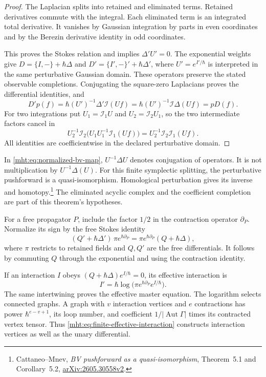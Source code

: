\begin{proof}
The Laplacian splits into retained and eliminated terms. Retained
derivatives commute with the integral. Each eliminated term is an
integrated total derivative. It vanishes by Gaussian integration by
parts in even coordinates and by the Berezin derivative identity in
odd coordinates.

This proves the Stokes relation and implies $\Delta'U'=0$.
The exponential weights give
$D=\{I,-\}+\hbar\Delta$ and
$D'=\{I',-\}'+\hbar\Delta'$, where $U'=e^{I'/\hbar}$ is
interpreted in the same perturbative Gaussian domain. These
operators preserve the stated observable completions. Conjugating
the square-zero Laplacians proves the differential identities, and
\[
 D'p(f)=\hbar(U')^{-1}\Delta'\mathcal I(Uf)
       =\hbar(U')^{-1}\mathcal I\Delta(Uf)=pD(f).
\]
For two integrations put $U_1=\mathcal I_1U$ and
$U_2=\mathcal I_2U_1$, so the two intermediate factors cancel in
\[
 U_2^{-1}\mathcal I_2\bigl(U_1U_1^{-1}\mathcal I_1(Uf)\bigr)
       =U_2^{-1}\mathcal I_2\mathcal I_1(Uf).
\]
All identities are coefficientwise in the declared perturbative
domain.
\end{proof}

In \eqref{mht:eq:normalized-bv-map}, $U^{-1}\Delta U$ denotes
conjugation of operators. It is not multiplication by $U^{-1}\Delta(U)$.
For this finite symplectic splitting, the perturbative pushforward
is a quasi-isomorphism. Homological perturbation gives its inverse
and homotopy.\footnote{Cattaneo--Mnev,
\emph{BV pushforward as a quasi-isomorphism}, Theorem~5.1 and
Corollary~5.2, \href{https://arxiv.org/abs/2605.30558v2}{arXiv:2605.30558v2}.}
The eliminated acyclic complex and the coefficient completion are
part of this theorem's hypotheses.

For a free propagator $P$, include the factor $1/2$ in the contraction
operator $\partial_P$. Normalize its sign by the free Stokes identity
\[
 (Q'+\hbar\Delta')\,\pi e^{\hbar\partial_P}
       =\pi e^{\hbar\partial_P}(Q+\hbar\Delta),
\]
where $\pi$ restricts to retained fields and $Q,Q'$ are the free
differentials. It follows by commuting $Q$ through the exponential
and using the contraction identity.

If an interaction $I$ obeys
$(Q+\hbar\Delta)e^{I/\hbar}=0$, its effective interaction is
\begin{equation}\label{mht:eq:finite-effective-interaction}
 I'=\hbar\log\bigl(\pi e^{\hbar\partial_P}e^{I/\hbar}\bigr).
\end{equation}
The same intertwining proves the effective master equation.
The logarithm selects connected graphs. A graph with $v$ interaction
vertices and $e$ contractions has power $\hbar^{e-v+1}$, its loop
number, and coefficient $1/|\operatorname{Aut}\Gamma|$ times its
contracted vertex tensor. Thus \eqref{mht:eq:finite-effective-interaction}
constructs interaction vertices as well as the unary differential.

